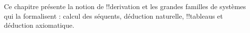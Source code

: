 \documentclass[../../../include/open-logic-chapter]{subfiles}
\begin{document}
      {}
      {}

Ce chapitre présente
la notion de !!{derivation}
et les grandes familles de systèmes qui la formalisent :
calcul des séquents,
déduction naturelle, !!{tableau}s
et déduction axiomatique.






\OLEndChapterHook
\end{document}
